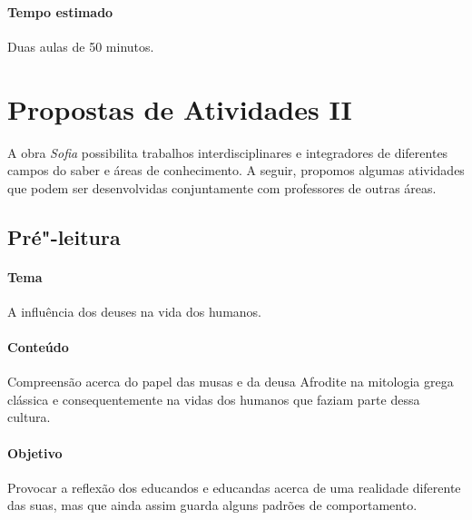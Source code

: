 \documentclass[12pt]{extarticle}
\begin{document}
\paragraph{Tempo estimado} Duas aulas de 50 minutos.

\pagebreak\section{Propostas de Atividades II}


A obra \emph{\textit{Sofia}} possibilita trabalhos interdisciplinares e integradores de
diferentes campos do saber e áreas de conhecimento. A seguir, propomos algumas
atividades que podem ser desenvolvidas conjuntamente com professores de outras
áreas. %


\subsection{Pré"-leitura} 

\paragraph{Tema} A influência dos deuses na vida dos humanos.

\paragraph{Conteúdo} Compreensão acerca do papel das musas e da deusa Afrodite
na mitologia grega clássica e consequentemente na vidas dos humanos que faziam parte dessa cultura.

\paragraph{Objetivo} Provocar a reflexão dos educandos e educandas acerca de
uma realidade diferente das suas, mas que ainda assim guarda alguns padrões 
de comportamento. 
\end{document}
